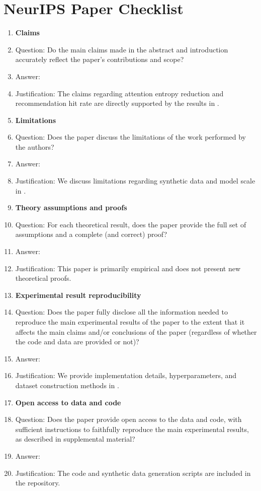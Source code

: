 \newpage
\section*{NeurIPS Paper Checklist}

\begin{enumerate}

\item {\bf Claims}
    \item[] Question: Do the main claims made in the abstract and introduction accurately reflect the paper's contributions and scope?
    \item[] Answer: \answerYes{}
    \item[] Justification: The claims regarding attention entropy reduction and recommendation hit rate are directly supported by the results in .

\item {\bf Limitations}
    \item[] Question: Does the paper discuss the limitations of the work performed by the authors?
    \item[] Answer: \answerYes{}
    \item[] Justification: We discuss limitations regarding synthetic data and model scale in .

\item {\bf Theory assumptions and proofs}
    \item[] Question: For each theoretical result, does the paper provide the full set of assumptions and a complete (and correct) proof?
    \item[] Answer: \answerNA{}
    \item[] Justification: This paper is primarily empirical and does not present new theoretical proofs.

\item {\bf Experimental result reproducibility}
    \item[] Question: Does the paper fully disclose all the information needed to reproduce the main experimental results of the paper to the extent that it affects the main claims and/or conclusions of the paper (regardless of whether the code and data are provided or not)?
    \item[] Answer: \answerYes{}
    \item[] Justification: We provide implementation details, hyperparameters, and dataset construction methods in .

\item {\bf Open access to data and code}
    \item[] Question: Does the paper provide open access to the data and code, with sufficient instructions to faithfully reproduce the main experimental results, as described in supplemental material?
    \item[] Answer: \answerYes{}
    \item[] Justification: The code and synthetic data generation scripts are included in the repository.


\end{enumerate}
